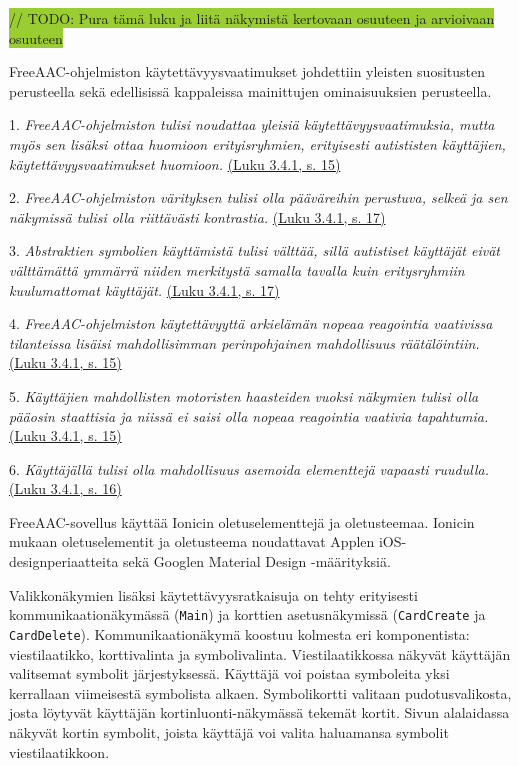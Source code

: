 \documentclass[utf8]{gradu3}
\begin{document}
\colorbox{YellowGreen}{// TODO: Pura tämä luku ja liitä näkymistä kertovaan osuuteen ja arvioivaan osuuteen}

FreeAAC-ohjelmiston käytettävyysvaatimukset johdettiin yleisten suositusten perusteella sekä edellisissä kappaleissa mainittujen ominaisuuksien perusteella.

1. \textit{FreeAAC-ohjelmiston tulisi noudattaa yleisiä käytettävyysvaatimuksia, mutta myös sen lisäksi ottaa huomioon erityisryhmien, erityisesti autististen käyttäjien, käytettävyysvaatimukset huomioon.} \hyperref[general-usability-requirements]{(Luku 3.4.1, s. 15)}

2. \textit{FreeAAC-ohjelmiston värityksen tulisi olla pääväreihin perustuva, selkeä ja sen näkymissä tulisi olla riittävästi kontrastia.} \hyperref[AAC-colors]{(Luku 3.4.1, s. 17)}

3. \textit{Abstraktien symbolien käyttämistä tulisi välttää, sillä autistiset käyttäjät eivät välttämättä ymmärrä niiden merkitystä samalla tavalla kuin eritysryhmiin kuulumattomat käyttäjät.} \hyperref[AAC-abstract-symbols]{(Luku 3.4.1, s. 17)}

4. \textit{FreeAAC-ohjelmiston käytettävyyttä arkielämän nopeaa reagointia vaativissa tilanteissa lisäisi mahdollisimman perinpohjainen mahdollisuus räätälöintiin.} \hyperref[AAC-context-settings]{(Luku 3.4.1, s. 15)}

5. \textit{Käyttäjien mahdollisten motoristen haasteiden vuoksi näkymien tulisi olla pääosin staattisia ja niissä ei saisi olla nopeaa reagointia vaativia tapahtumia.} \hyperref[AAC-staticity]{(Luku 3.4.1, s. 15)}

6. \textit{Käyttäjällä tulisi olla mahdollisuus asemoida elementtejä vapaasti ruudulla.} \hyperref[AAC-staticity]{(Luku 3.4.1, s. 16)}

FreeAAC-sovellus käyttää Ionicin oletuselementtejä ja oletusteemaa. Ionicin mukaan oletuselementit ja oletusteema noudattavat Applen iOS-designperiaatteita sekä Googlen Material Design -määrityksiä.  

Valikkonäkymien lisäksi käytettävyysratkaisuja on tehty erityisesti kommunikaationäkymässä (\texttt{Main}) ja korttien asetusnäkymissä (\texttt{CardCreate} ja \texttt{CardDelete}). Kommunikaationäkymä koostuu kolmesta eri komponentista: viestilaatikko, korttivalinta ja symbolivalinta. Viestilaatikkossa näkyvät käyttäjän valitsemat symbolit järjestyksessä. Käyttäjä voi poistaa symboleita yksi kerrallaan viimeisestä symbolista alkaen. Symbolikortti valitaan pudotusvalikosta, josta löytyvät käyttäjän kortinluonti-näkymässä tekemät kortit. Sivun alalaidassa näkyvät kortin symbolit, joista käyttäjä voi valita haluamansa symbolit viestilaatikkoon.
\end{document}
